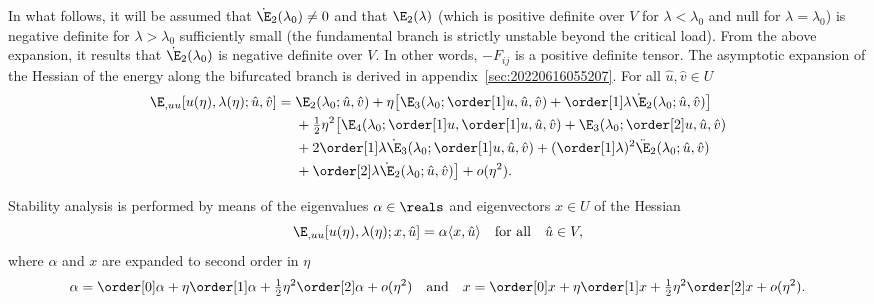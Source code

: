 In what follows, it will be assumed that $\dot{\E}_2(\lambda_0)\neq0$ and that $\E_2(\lambda)$ (which is positive
definite over $V$ for $\lambda<\lambda_0$ and null for $\lambda=\lambda_0$) is negative definite for $\lambda>\lambda_0$
sufficiently small (the fundamental branch is strictly unstable beyond the critical load). From the above expansion, it
results that $\dot{\E}_2(\lambda_0)$ is negative definite over $V$. In other words, $-F_{ij}$ is a positive definite
tensor. The asymptotic expansion of the Hessian of the energy along the bifurcated branch is derived in
appendix~\ref{sec:20220616055207}. For all $\hat{u}, \hat{v} \in U$
\begin{equation}
  \label{eq:20220531054247}
  \begin{aligned}[b]
    \E_{, uu}[u(\eta), \lambda(\eta); \hat{u}, \hat{v}] ={}
    & \E_2(\lambda_0 ; \hat{u}, \hat{v}) + \eta \bigl[\E_3(\lambda_0 ; \order[1]u, \hat{u}, \hat{v})  + \order[1]\lambda \dot{\E}_2(\lambda_0; \hat{u}, \hat{v})\bigr]\\
    &+ \tfrac{1}{2} \eta^2 \bigl[\E_4(\lambda_0; \order[1]u, \order[1]u, \hat{u}, \hat{v}) + \E_3(\lambda_0; \order[2]u, \hat{u}, \hat{v})\\
    & + 2\order[1]\lambda \dot{\E}_3(\lambda_0; \order[1]u, \hat{u}, \hat{v}) + ( \order[1]\lambda )^2 \ddot{\E}_2(\lambda_0; \hat{u}, \hat{v})\\
    & + \order[2]\lambda \dot{\E}_2(\lambda_0; \hat{u}, \hat{v}) \bigr] + o(\eta^2).
  \end{aligned}
\end{equation}

Stability analysis is performed by means of the eigenvalues $\alpha \in \reals$ and eigenvectors $x \in U$ of the
Hessian
\begin{equation}
  \label{eq:20220617074949}
  \E_{, u u} [u(\eta), \lambda(\eta); x, \hat{u}] = \alpha \langle x, \hat{u} \rangle \quad \text{for all} \quad \hat{u} \in V,
\end{equation}
where $\alpha$ and $x$ are expanded to second order in $\eta$
\begin{equation}
  \label{eq:20220617064633}
  \alpha = \order[0]\alpha + \eta \order[1]\alpha + \tfrac{1}{2} \eta^2 \order[2]\alpha + o(\eta^2)
  \quad \text{and} \quad
  x = \order[0]x + \eta \order[1]x + \tfrac{1}{2} \eta^2 \order[2]x + o(\eta^2).
\end{equation}

